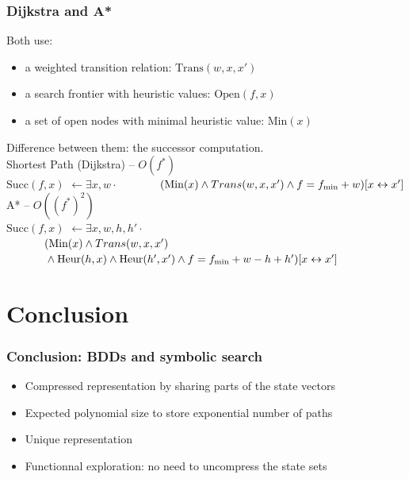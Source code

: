 \documentclass[10pt,a4paper,pdf]{beamer}
\renewcommand{\t}[1]{\text{#1}}
\begin{document}
\begin{frame}
\frametitle{Dijkstra and A*}

Both use:
\begin{itemize}
\item a weighted transition relation: $\t{Trans}(w,x,x')$
\item a search frontier with heuristic values: $\t{Open}(f,x)$
\item a set of open nodes with minimal heuristic value: $\t{Min}(x)$ 
\end{itemize}

Difference between them: the successor computation.\\[.8cm]

Shortest Path (Dijkstra) -- $O(f^*)$\\[0.2cm]
$\t{Succ}(f,x)$ $\leftarrow 
			       \exists x,w \cdot$ 
				       $\phantom{} \hspace{1.2cm} ( \t{Min}(x) \land Trans(w,x,x') \land
				       f=f_\t{min}+w)[x \leftrightarrow x']$				       
				       \\[.8cm]
A* -- $O((f^*)^2)$\\[0.2cm]
$\t{Succ}(f,x)$ $\leftarrow 
				       \exists x,w,h,h' \cdot$\\
				       $\phantom{} \hspace{1.2cm} ( \t{Min}(x) \land Trans(w,x,x')$
				       $\phantom{} \hspace{1.2cm}
				       \land \t{Heur}(h,x) \land \t{Heur}(h',x') \land f=f_\t{min}+w-h+h')
				       [x \leftrightarrow x']$

\end{frame}

%

\section{Conclusion}
\begin{frame}
\frametitle{Conclusion: BDDs and symbolic search}
\begin{itemize}
\item Compressed representation by sharing parts of the state vectors
\item Expected polynomial size to store exponential number of paths
\item Unique representation
\item Functionnal exploration: no need to uncompress the state sets
\end{itemize}
\end{frame}
\end{document}
